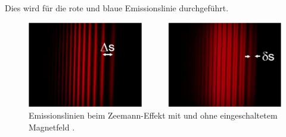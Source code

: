 Dies wird für die rote und blaue Emissionslinie durchgeführt.
\begin{figure}[htb]
  \centering
  \includegraphics{images/V27_8.pdf}
  \caption{Emissionslinien beim Zeemann-Effekt mit und ohne eingeschaltetem Magnetfeld \cite{anleitung}.}
  \label{abb:streifen}
\end{figure}
